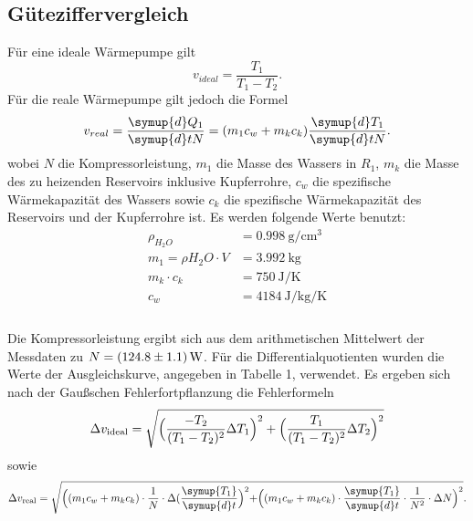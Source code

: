 \subsection{Güteziffervergleich}
Für eine ideale Wärmepumpe gilt
\begin{equation}
  v_{ideal} = \frac{T_1}{T_1-T_2}.
\end{equation}
Für die reale Wärmepumpe gilt jedoch die Formel
\begin{equation}
  v_{real}= \frac{\symup{d} Q_1}{\symup{d} tN} = (m_1c_w+m_kc_k)\frac{\symup{d} T_1}{\symup{d} tN}.
\end{equation}
wobei $ N$ die Kompressorleistung, $ m_1$ die Masse des Wassers in $ R_1 $, $m_k$ die Masse des zu heizenden Reservoirs inklusive Kupferrohre, $ c_w $ die spezifische Wärmekapazität des Wassers sowie $ c_k $ die spezifische Wärmekapazität des Reservoirs und der Kupferrohre ist.
Es werden folgende Werte benutzt:
\begin{align*}
  \rho_{H_2O} &= \SI[per-mode=fraction]{0.998}{\gram\per\centi\metre\tothe{3}} \\
  m_1 = \rho{H_2O} \cdot V &= \SI[per-mode=fraction]{3,992}{\kilogram} \\
  m_k \cdot c_k &= \SI[per-mode=fraction]{750}{\joule\per\kelvin} \\
  c_w &= \SI[per-mode=fraction]{4184}{\joule\per\kilogram\per\kelvin} \\
\end{align*}
 \cite{lecher2001taschenbuch} \\
Die Kompressorleistung ergibt sich aus dem arithmetischen Mittelwert der Messdaten zu $N=\SI{124.8+-1.1}{\watt}$.
Für die Differentialquotienten wurden die Werte der Ausgleichskurve, angegeben in Tabelle 1, verwendet.
Es ergeben sich nach der Gaußschen Fehlerfortpflanzung die Fehlerformeln
\begin{equation}
  \Delta v_{\text{ideal}} = \sqrt{ \Bigl( \frac{-T_2}{(T_1-T_2)^2} \Delta T_1 \Bigr)^2 + \Bigl( \frac{T_1}{(T_1-T_2)^2} \Delta T_2 \Bigr)^2}
\end{equation}
sowie
\begin{equation}
  \Delta v_{\text{real}} = \sqrt{ \Bigl( (m_1 c_w + m_k c_k) \cdot \frac{1}{N} \cdot\Delta(\frac{\symup{T_1}}{\symup{d}t}   \Bigr)^2 + \Bigr( (m_1 c_w + m_k c_k) \cdot \frac{\symup{T_1}}{\symup{d}t} \cdot \frac{1}{N^2} \cdot \Delta N  \Bigl)^2 } .
\end{equation}
